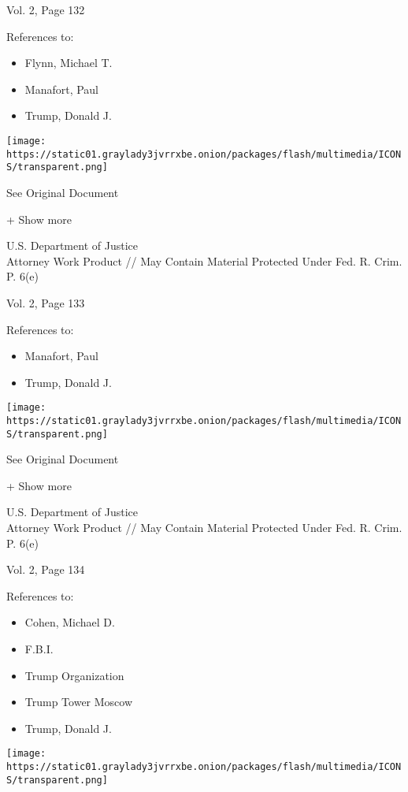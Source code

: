 Vol. 2, Page 132

References to:

\begin{itemize}
\tightlist
\item
  Flynn, Michael T.
\item
  Manafort, Paul 
\item
  Trump, Donald J.
\end{itemize}

\protect\hyperlink{}{}

\texttt{[image: https://static01.graylady3jvrrxbe.onion/packages/flash/multimedia/ICONS/transparent.png]}

See Original Document

+ Show more

U.S. Department of Justice\\
Attorney Work Product // May Contain Material Protected Under Fed. R.
Crim. P. 6(e)

Vol. 2, Page 133

References to:

\begin{itemize}
\tightlist
\item
  Manafort, Paul 
\item
  Trump, Donald J.
\end{itemize}

\protect\hyperlink{}{}

\texttt{[image: https://static01.graylady3jvrrxbe.onion/packages/flash/multimedia/ICONS/transparent.png]}

See Original Document

+ Show more

U.S. Department of Justice\\
Attorney Work Product // May Contain Material Protected Under Fed. R.
Crim. P. 6(e)

Vol. 2, Page 134

References to:

\begin{itemize}
\tightlist
\item
  Cohen, Michael D.
\item
  F.B.I.
\item
  Trump Organization
\item
  Trump Tower Moscow
\item
  Trump, Donald J.
\end{itemize}

\protect\hyperlink{}{}

\texttt{[image: https://static01.graylady3jvrrxbe.onion/packages/flash/multimedia/ICONS/transparent.png]}

